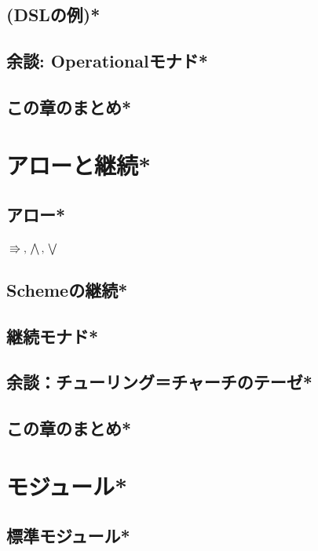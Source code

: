 \documentclass[a5paper,twoside,fleqn]{jsbook}
\newcommand{\programminglanguage}[1]{\textsf{#1}}
\newcommand{\scheme}{\programminglanguage{Scheme}}
\DeclareMathOperator{\mArrow}{\Rrightarrow}
\DeclareMathOperator{\mArrowAnd}{\bigwedge}%
\DeclareMathOperator{\mArrowOr}{\bigvee}%
\begin{document}
\section{(DSLの例)*}
\section{余談: Operationalモナド*}
\section{この章のまとめ*}



\chapter{アローと継続*}
\section{アロー*}
$\mArrow,\mArrowAnd,\mArrowOr$
\section{\scheme の継続*}
\section{継続モナド*}
\section{余談：チューリング＝チャーチのテーゼ*}
\section{この章のまとめ*}

\chapter{モジュール*}
\section{標準モジュール*}
\end{document}
